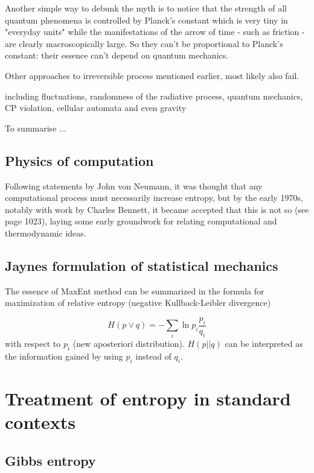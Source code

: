 \documentclass[a4paper,12pt]{article}
\begin{document}
Another simple way to debunk the myth is to notice that the strength of all quantum phenomena is controlled by Planck's constant which is very tiny in "everyday units" while the manifestations of the arrow of time - such as friction - are clearly macroscopically large. So they can't be proportional to Planck's constant: their essence can't depend on quantum mechanics.

Other approaches to irreversible process mentioned earlier, most likely also fail.

including fluctuations, randomness of the radiative process, quantum mechanics, CP violation, cellular automata and even gravity

To summarise ...

\subsection{Physics of computation}

Following statements by John von Neumann, it was thought that any computational process must necessarily increase entropy,  but by the early 1970s, notably with work by Charles Bennett, it became accepted that this is not so (see page 1023), laying some early groundwork for relating computational and thermodynamic ideas. 

\subsection{Jaynes formulation of statistical mechanics}

The essence of MaxEnt method can be summarized in the formula for maximization of relative entropy (negative Kullback-Leibler divergence)

\begin{displaymath}
  H(p\lor q) = -\sum_i \ln p_i \frac{p_i}{q_i}
\end{displaymath}
with respect to $p_i$ (new aposteriori distribution). $H(p||q)$ can be interpreted as the information gained by using $p_i$ instead of $q_i$.


\section{Treatment of entropy in standard contexts}

\subsection{Gibbs entropy}
\end{document}

